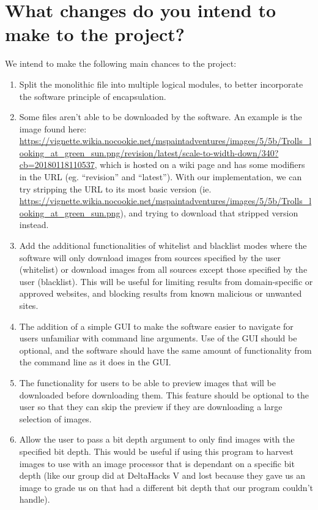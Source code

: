 \documentclass[12pt]{article}
\begin{document}
\section* {What changes do you intend to make to the project?}
We intend to make the following main chances to the project: \\
\begin{enumerate}
\item Split the monolithic file into multiple logical modules, to better incorporate the software principle of encapsulation.

\item Some files aren’t able to be downloaded by the software. An example is the image found here: \url{ https://vignette.wikia.nocookie.net/mspaintadventures/images/5/5b/Trolls_looking_at_green_sun.png/revision/latest/scale-to-width-down/340?cb=20180118110537}, which is hosted on a wiki page and has some modifiers in the URL (eg. “revision” and “latest”). With our implementation, we can try stripping the URL to its most basic version (ie. \url{https://vignette.wikia.nocookie.net/mspaintadventures/images/5/5b/Trolls_looking_at_green_sun.png}), and trying to download that stripped version instead.

\item Add the additional functionalities of whitelist and blacklist modes where the software will only download images from sources specified by the user (whitelist) or download images from all sources except those specified by the user (blacklist). This will be useful for limiting results from domain-specific or approved websites, and blocking results from known malicious or unwanted sites.

\item The addition of a simple GUI to make the software easier to navigate for users unfamiliar with command line arguments. Use of the GUI should be optional, and the software should have the same amount of functionality from the command line as it does in the GUI.

\item The functionality for users to be able to preview images that will be downloaded before downloading them. This feature should be optional to the user so that they can skip the preview if they are downloading a large selection of images.

\item Allow the user to pass a bit depth argument to only find images with the specified bit depth. This would be useful if using this program to harvest images to use with an image processor that is dependant on a specific bit depth (like our group did at DeltaHacks V and lost because they gave us an image to grade us on that had a different bit depth that our program couldn’t handle).

\end{enumerate}
\end{document}
